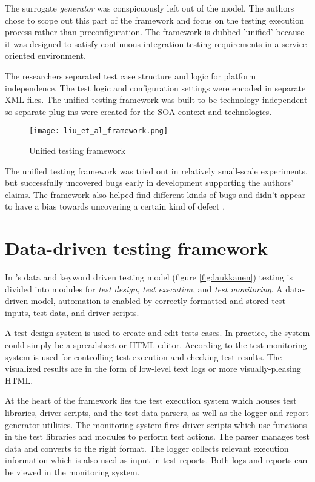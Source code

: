 \documentclass[12pt,a4paper,oneside,pdftex]{report}
\begin{document}
The surrogate \emph{generator} was conspicuously left out of the model. The authors chose to scope out this part of the framework and focus on the testing execution process rather than preconfiguration. The framework is dubbed 'unified' because it was designed to satisfy continuous integration testing requirements in a service-oriented environment.

The researchers separated test case structure and logic for platform independence. The test logic and configuration settings were encoded in separate XML files. The unified testing framework was built to be technology independent so 
separate plug-ins were created for the SOA context and technologies.

\begin{figure}[H]
  \begin{center}
    \texttt{[image: liu\_et\_al\_framework.png]}
    \caption{Unified testing framework \citep{liu2009unified}}
    \label{fig:liu}
  \end{center}
\end{figure}

The unified testing framework was tried out in relatively small-scale experiments, but successfully uncovered bugs early in development supporting the authors' claims. The framework also helped find different kinds of bugs and didn't appear to have a bias towards uncovering a certain kind of defect \citep{liu2009unified}.

\section{Data-driven testing framework}

In \citeauthor{laukkanen2006data}'s \citeyearpar{laukkanen2006data} data and keyword driven testing model (figure \ref{fig:laukkanen}) testing is divided into modules for \emph{test design}, \emph{test execution}, and \emph{test monitoring}. A data-driven model, automation is enabled by correctly formatted and stored test inputs, test data, and driver scripts.

A test design system is used to create and edit tests cases. In practice, the system could simply be a spreadsheet or HTML editor. According to \citet{laukkanen2006data} the test monitoring system is used for controlling test execution and checking test results. The visualized results are in the form of low-level text logs or more visually-pleasing HTML.

At the heart of the framework lies the test execution system which houses test libraries, driver scripts, and the test data parsers, as well as the logger and report generator utilities. The monitoring system fires driver scripts which use functions in the test libraries and modules to perform test actions. The parser manages test data and converts to the right format. The logger collects relevant execution information which is also used as input in test reports. Both logs and reports can be viewed in the monitoring system. \citep{laukkanen2006data}
\end{document}
